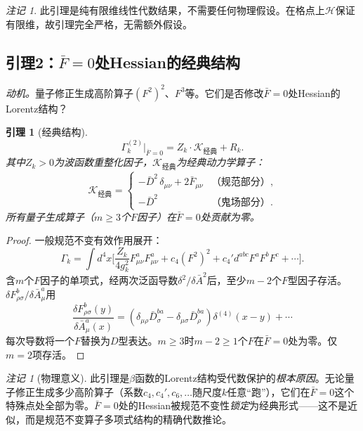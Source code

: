 \documentclass[12pt,a4paper]{article}
\theoremstyle{plain}
\newtheorem{lemma}[theorem]{引理}
\theoremstyle{definition}
\theoremstyle{remark}
\newtheorem{remark}[theorem]{注记}
\begin{document}
\begin{remark}
此引理是纯有限维线性代数结果，不需要任何物理假设。在格点上$\mathcal{H}$保证有限维，故引理完全严格，无需额外假设。
\end{remark}

\subsection{引理2：$\bar{F}=0$处Hessian的经典结构}\label{sec:lemma2}

\textit{动机。}量子修正生成高阶算子$(F^2)^2$、$F^3$等。它们是否修改$\bar{F}=0$处Hessian的Lorentz结构？

\begin{lemma}[经典结构]\label{lem:cl}
\begin{equation}\label{eq:classical}
\Gamma_k^{(2)}\big|_{\bar{F}=0} = Z_k\cdot\mathcal{K}_{\text{经典}} + R_k.
\end{equation}
其中$Z_k>0$为波函数重整化因子，$\mathcal{K}_{\text{经典}}$为经典动力学算子：
\begin{equation}
\mathcal{K}_{\text{经典}} = \begin{cases}
-\bar{D}^2\,\delta_{\mu\nu} + 2\bar{F}_{\mu\nu} &\text{（规范部分）},\\
-\bar{D}^2 &\text{（鬼场部分）}.
\end{cases}
\end{equation}
所有量子生成算子（$m\geq 3$个$F$因子）在$\bar{F}=0$处贡献为零。
\end{lemma}

\begin{proof}
一般规范不变有效作用展开：
\begin{equation}\label{eq:Gammaexpand}
\Gamma_k = \int d^4x\Big[\frac{Z_k}{4g_k^2}F_{\mu\nu}^aF_{\mu\nu}^a + c_4(F^2)^2 + c_4'd^{abc}F^aF^bF^c + \cdots\Big].
\end{equation}
含$m$个$F$因子的单项式，经两次泛函导数$\delta^2/\delta\bar{A}^2$后，至少$m-2$个$F$型因子存活。$\delta F_{\rho\sigma}^b/\delta\bar{A}_\mu^a$用
\begin{equation}\label{eq:dFdA}
\frac{\delta F_{\rho\sigma}^b(y)}{\delta\bar{A}_\mu^a(x)} = (\delta_{\mu\rho}\bar{D}_\sigma^{ba}-\delta_{\mu\sigma}\bar{D}_\rho^{ba})\delta^{(4)}(x-y)+\cdots
\end{equation}
每次导数将一个$F$替换为$D$型表达。$m\geq 3$时$m-2\geq 1$个$F$在$\bar{F}=0$处为零。仅$m=2$项存活。
\end{proof}

\begin{remark}[物理意义]\label{rem:locking}
此引理是$\beta$函数的Lorentz结构受代数保护的\emph{根本原因}。无论量子修正生成多少高阶算子（系数$c_4,c_4',c_6,\ldots$随尺度$k$任意``跑''），它们在$\bar{F}=0$这个特殊点处全部为零。$\bar{F}=0$处的Hessian被规范不变性\emph{锁定}为经典形式——这不是近似，而是规范不变算子多项式结构的精确代数推论。
\end{remark}
\end{document}
